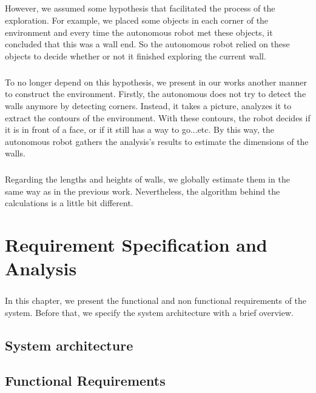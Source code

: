 \documentclass[12pt]{report}
\begin{document}
\paragraph{}
However, we assumed some hypothesis that facilitated the process of the exploration. For example, we placed some objects in each corner of the environment and every time the autonomous robot met these objects, it concluded that this was a wall end. So the autonomous robot relied on these objects to decide whether or not it finished exploring the current wall. 

\paragraph{}
To no longer depend on this hypothesis, we present in our works another manner to construct the environment. Firstly, the autonomous does not try to detect the walls anymore by detecting corners. Instead, it takes a picture, analyzes it to extract the contours of the environment. With these contours, the robot decides if it is in front of a face, or if it still has a way to go...etc.
By this way, the autonomous robot gathers the analysis's results to estimate the dimensions of the walls.

\paragraph{}
Regarding the lengths and heights of walls, we globally estimate them in the same way as in the previous work. Nevertheless, the algorithm behind the calculations is a little bit different.  


\chapter{Requirement Specification and Analysis}
\paragraph{}
In this chapter, we present the functional and non functional requirements of the system. Before that, we specify the system architecture with a brief overview. 
\section{System architecture}

\section{Functional Requirements}
\end{document}
